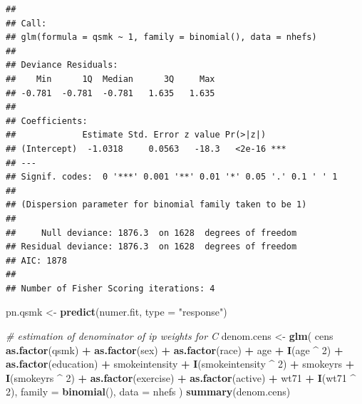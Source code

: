 \documentclass[
  10pt,
]{book}
\newenvironment{Shaded}{\begin{snugshade}}{\end{snugshade}}
\newcommand{\CommentTok}[1]{\textcolor[rgb]{0.56,0.35,0.01}{\textit{#1}}}
\newcommand{\DataTypeTok}[1]{\textcolor[rgb]{0.13,0.29,0.53}{#1}}
\newcommand{\DecValTok}[1]{\textcolor[rgb]{0.00,0.00,0.81}{#1}}
\newcommand{\KeywordTok}[1]{\textcolor[rgb]{0.13,0.29,0.53}{\textbf{#1}}}
\newcommand{\NormalTok}[1]{#1}
\newcommand{\OperatorTok}[1]{\textcolor[rgb]{0.81,0.36,0.00}{\textbf{#1}}}
\newcommand{\StringTok}[1]{\textcolor[rgb]{0.31,0.60,0.02}{#1}}
\begin{document}
\begin{verbatim}
## 
## Call:
## glm(formula = qsmk ~ 1, family = binomial(), data = nhefs)
## 
## Deviance Residuals: 
##    Min      1Q  Median      3Q     Max  
## -0.781  -0.781  -0.781   1.635   1.635  
## 
## Coefficients:
##             Estimate Std. Error z value Pr(>|z|)    
## (Intercept)  -1.0318     0.0563   -18.3   <2e-16 ***
## ---
## Signif. codes:  0 '***' 0.001 '**' 0.01 '*' 0.05 '.' 0.1 ' ' 1
## 
## (Dispersion parameter for binomial family taken to be 1)
## 
##     Null deviance: 1876.3  on 1628  degrees of freedom
## Residual deviance: 1876.3  on 1628  degrees of freedom
## AIC: 1878
## 
## Number of Fisher Scoring iterations: 4
\end{verbatim}

\begin{Shaded}
\begin{Highlighting}[]
\NormalTok{pn.qsmk <-}\StringTok{ }\KeywordTok{predict}\NormalTok{(numer.fit, }\DataTypeTok{type =} \StringTok{"response"}\NormalTok{)}

\CommentTok{# estimation of denominator of ip weights for C}
\NormalTok{denom.cens <-}\StringTok{ }\KeywordTok{glm}\NormalTok{(}
\NormalTok{  cens }\OperatorTok{~}\StringTok{ }\KeywordTok{as.factor}\NormalTok{(qsmk) }\OperatorTok{+}\StringTok{ }\KeywordTok{as.factor}\NormalTok{(sex) }\OperatorTok{+}
\StringTok{    }\KeywordTok{as.factor}\NormalTok{(race) }\OperatorTok{+}\StringTok{ }\NormalTok{age }\OperatorTok{+}\StringTok{ }\KeywordTok{I}\NormalTok{(age }\OperatorTok{^}\StringTok{ }\DecValTok{2}\NormalTok{) }\OperatorTok{+}
\StringTok{    }\KeywordTok{as.factor}\NormalTok{(education) }\OperatorTok{+}\StringTok{ }\NormalTok{smokeintensity }\OperatorTok{+}
\StringTok{    }\KeywordTok{I}\NormalTok{(smokeintensity }\OperatorTok{^}\StringTok{ }\DecValTok{2}\NormalTok{) }\OperatorTok{+}\StringTok{ }\NormalTok{smokeyrs }\OperatorTok{+}\StringTok{ }\KeywordTok{I}\NormalTok{(smokeyrs }\OperatorTok{^}\StringTok{ }\DecValTok{2}\NormalTok{) }\OperatorTok{+}
\StringTok{    }\KeywordTok{as.factor}\NormalTok{(exercise) }\OperatorTok{+}\StringTok{ }\KeywordTok{as.factor}\NormalTok{(active) }\OperatorTok{+}\StringTok{ }\NormalTok{wt71 }\OperatorTok{+}\StringTok{ }\KeywordTok{I}\NormalTok{(wt71 }\OperatorTok{^}\StringTok{ }\DecValTok{2}\NormalTok{),}
  \DataTypeTok{family =} \KeywordTok{binomial}\NormalTok{(),}
  \DataTypeTok{data =}\NormalTok{ nhefs}
\NormalTok{)}
\KeywordTok{summary}\NormalTok{(denom.cens)}
\end{Highlighting}
\end{Shaded}
\end{document}
